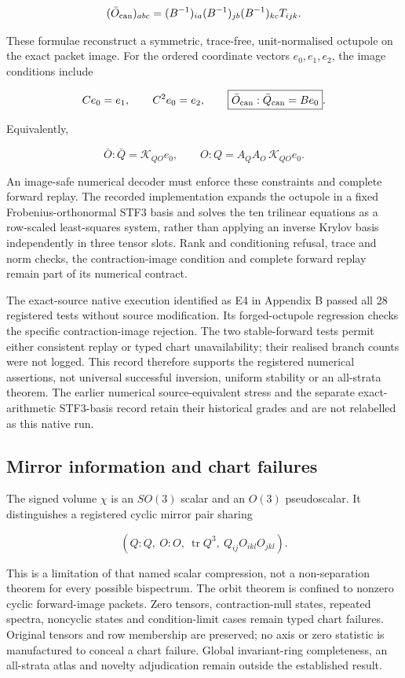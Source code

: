 \documentclass[
  11pt,
  a4paper]{article}
\begin{document}
\[
(\bar O_{\rm can})_{abc}
=(B^{-1})_{ia}(B^{-1})_{jb}(B^{-1})_{kc}T_{ijk}.
\]

These formulae reconstruct a symmetric, trace-free, unit-normalised octupole on the exact packet image. For the ordered coordinate vectors \(e_0,e_1,e_2\), the image conditions include

\[
Ce_0=e_1,\qquad C^2e_0=e_2,
\qquad \boxed{\bar O_{\rm can}:\bar Q_{\rm can}=Be_0}.
\]

Equivalently,

\[
\bar O:\bar Q=\mathscr K_{QO}e_0,
\qquad O:Q=A_QA_O\,\mathscr K_{QO}e_0.
\]

An image-safe numerical decoder must enforce these constraints and complete forward replay. The recorded implementation expands the octupole in a fixed Frobenius-orthonormal STF3 basis and solves the ten trilinear equations as a row-scaled least-squares system, rather than applying an inverse Krylov basis independently in three tensor slots. Rank and conditioning refusal, trace and norm checks, the contraction-image condition and complete forward replay remain part of its numerical contract.

The exact-source native execution identified as E4 in Appendix B passed all 28 registered tests without source modification. Its forged-octupole regression checks the specific contraction-image rejection. The two stable-forward tests permit either consistent replay or typed chart unavailability; their realised branch counts were not logged. This record therefore supports the registered numerical assertions, not universal successful inversion, uniform stability or an all-strata theorem. The earlier numerical source-equivalent stress and the separate exact-arithmetic STF3-basis record retain their historical grades and are not relabelled as this native run.

\hypertarget{mirror-information-and-chart-failures}{%
\subsection{Mirror information and chart failures}\label{mirror-information-and-chart-failures}}

The signed volume \(\chi\) is an \(SO(3)\) scalar and an \(O(3)\) pseudoscalar. It distinguishes a registered cyclic mirror pair sharing

\[
(Q:Q,\ O:O,\ \operatorname{tr}Q^3,\ Q_{ij}O_{ikl}O_{jkl}).
\]

This is a limitation of that named scalar compression, not a non-separation theorem for every possible bispectrum. The orbit theorem is confined to nonzero cyclic forward-image packets. Zero tensors, contraction-null states, repeated spectra, noncyclic states and condition-limit cases remain typed chart failures. Original tensors and row membership are preserved; no axis or zero statistic is manufactured to conceal a chart failure. Global invariant-ring completeness, an all-strata atlas and novelty adjudication remain outside the established result.
\end{document}
